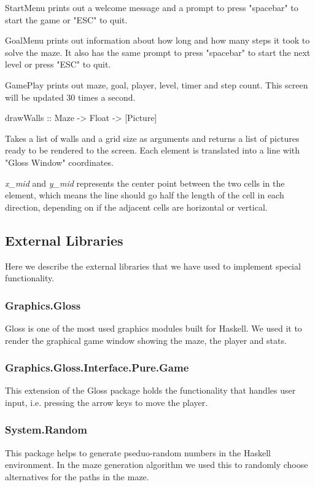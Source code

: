 \documentclass[12pt, a4paper]{article}
\begin{document}
StartMenu prints out a welcome message and a prompt to press "spacebar" to start the game or "ESC" to quit.
 
GoalMenu prints out information about how long and how many steps it took to solve the maze. It also has the same prompt to press "spacebar" to start the next level or press "ESC" to quit.
 
GamePlay prints out maze, goal, player, level, timer and step count. This screen will be updated 30 times a second.


\begin{code}
drawWalls :: Maze -> Float -> [Picture]
\end{code}
Takes a list of walls and a grid size as arguments and returns a list of pictures ready to be rendered to the screen. Each element is translated into a line with "Gloss Window" coordinates. 

\textit{x\_mid} and \textit{y\_mid} represents the center point between the two cells in the element, which means the line should go half the length of the cell in each direction, depending on if the adjacent cells are horizontal or vertical.





\subsection{External Libraries}
Here we describe the external libraries that we have used to implement special functionality.


\subsubsection*{Graphics.Gloss}
Gloss is one of the most used graphics modules built for Haskell. We used it to render the graphical game window showing the maze, the player and stats.


\subsubsection*{Graphics.Gloss.Interface.Pure.Game}
This extension of the Gloss package holds the functionality that handles user input, i.e. pressing the arrow keys to move the player.


\subsubsection*{System.Random}
This package helps to generate pseduo-random numbers in the Haskell environment. In the maze generation algorithm we used this to randomly choose alternatives for the paths in the maze.\cite{System.Random}
\end{document}
